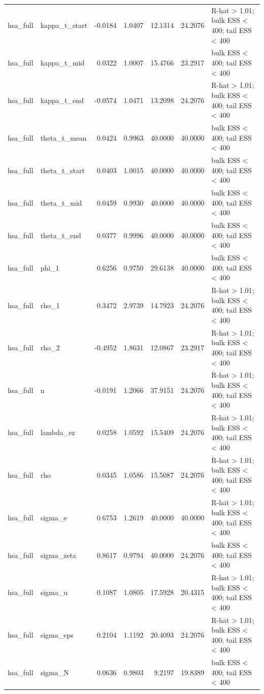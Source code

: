 \begin{tabular}{llrrrrl}
hsa\_full & kappa\_t\_start & -0.0184 & 1.0407 & 12.1314 & 24.2076 & R-hat > 1.01; bulk ESS < 400; tail ESS < 400 \\
hsa\_full & kappa\_t\_mid & 0.0322 & 1.0007 & 15.4766 & 23.2917 & bulk ESS < 400; tail ESS < 400 \\
hsa\_full & kappa\_t\_end & -0.0574 & 1.0471 & 13.2098 & 24.2076 & R-hat > 1.01; bulk ESS < 400; tail ESS < 400 \\
hsa\_full & theta\_t\_mean & 0.0424 & 0.9963 & 40.0000 & 40.0000 & bulk ESS < 400; tail ESS < 400 \\
hsa\_full & theta\_t\_start & 0.0403 & 1.0015 & 40.0000 & 40.0000 & bulk ESS < 400; tail ESS < 400 \\
hsa\_full & theta\_t\_mid & 0.0459 & 0.9930 & 40.0000 & 40.0000 & bulk ESS < 400; tail ESS < 400 \\
hsa\_full & theta\_t\_end & 0.0377 & 0.9996 & 40.0000 & 40.0000 & bulk ESS < 400; tail ESS < 400 \\
hsa\_full & phi\_1 & 0.6256 & 0.9750 & 29.6138 & 40.0000 & bulk ESS < 400; tail ESS < 400 \\
hsa\_full & rho\_1 & 0.3472 & 2.9739 & 14.7923 & 24.2076 & R-hat > 1.01; bulk ESS < 400; tail ESS < 400 \\
hsa\_full & rho\_2 & -0.4952 & 1.8631 & 12.0867 & 23.2917 & R-hat > 1.01; bulk ESS < 400; tail ESS < 400 \\
hsa\_full & n & -0.0191 & 1.2066 & 37.9151 & 24.2076 & R-hat > 1.01; bulk ESS < 400; tail ESS < 400 \\
hsa\_full & lambda\_ez & 0.0258 & 1.0592 & 15.5409 & 24.2076 & R-hat > 1.01; bulk ESS < 400; tail ESS < 400 \\
hsa\_full & rho & 0.0345 & 1.0586 & 15.5087 & 24.2076 & R-hat > 1.01; bulk ESS < 400; tail ESS < 400 \\
hsa\_full & sigma\_e & 0.6753 & 1.2619 & 40.0000 & 40.0000 & R-hat > 1.01; bulk ESS < 400; tail ESS < 400 \\
hsa\_full & sigma\_zeta & 0.8617 & 0.9794 & 40.0000 & 24.2076 & bulk ESS < 400; tail ESS < 400 \\
hsa\_full & sigma\_u & 0.1087 & 1.0805 & 17.5928 & 20.4315 & R-hat > 1.01; bulk ESS < 400; tail ESS < 400 \\
hsa\_full & sigma\_eps & 0.2104 & 1.1192 & 20.4093 & 24.2076 & R-hat > 1.01; bulk ESS < 400; tail ESS < 400 \\
hsa\_full & sigma\_N & 0.0636 & 0.9803 & 9.2197 & 19.8389 & bulk ESS < 400; tail ESS < 400 \\

\end{tabular}
